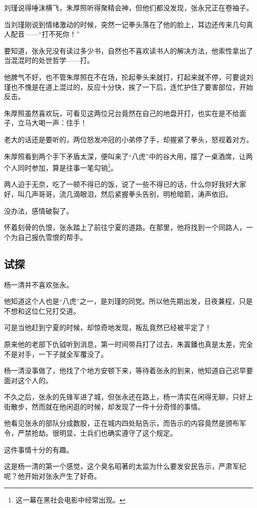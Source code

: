 \begin{multicols}{\theparacolNo}
刘瑾说得唾沫横飞，朱厚照听得聚精会神，但他们都没发现，张永兄正在卷袖子。

当刘瑾刚说到情绪激动的时候，突然一记拳头落在了他的脸上，耳边还传来几句真人配音——“打不死你！”

要知道，张永兄没有读过多少书，自然也不喜欢读书人的解决方法，他索性拿出了当混混时的处世哲学——打。

他脾气不好，也不管朱厚照在不在场，抡起拳头来就打，打起来就不停，可要说刘瑾也不愧是在道上混过的，反应十分快，挨了一下后，连忙护住了要害部位，开始反击。

朱厚照虽然喜欢玩，可看见这两位兄台竟然在自己的地盘开打，也实在是不给面子，立马大喝一声：住手！

老大的话还是要听的，两位怒发冲冠的小弟停了手，却握紧了拳头，怒视着对方。

朱厚照看到两个手下矛盾太深，便叫来了“八虎”中的谷大用，摆了一桌酒席，让两个人同时参加，算是往事一笔勾销\footnote{这一幕在黑社会电影中经常出现。}。

两人迫于无奈，吃了一顿不得已的饭，说了一些不得已的话，什么你好我好大家好，叫几声哥哥，流几滴眼泪，然后紧握拳头告别，明枪暗箭，涛声依旧。

没办法，感情破裂了。

怀着刻骨的仇恨，张永踏上了前往宁夏的道路。在那里，他将找到一个同路人，一个为自己报仇雪恨的帮手。

\subsection{试探}
杨一清并不喜欢张永。

他知道这个人也是“八虎”之一，是刘瑾的同党。所以他先期出发，日夜兼程，只是不想和这位仁兄打交道。

可是当他赶到宁夏的时候，却惊奇地发现，叛乱竟然已经被平定了！

原来他的老部下仇钺听到消息，第一时间带兵打了过去，朱寘鐇也真是太差，完全不是对手，一下子就全军覆没了。

杨一清没事做了，他找了个地方安顿下来，等待着张永的到来，他知道自己迟早要面对这个人的。

不久之后，张永的先锋军进了城，但张永还在路上，杨一清实在闲得无聊，只好上街散步，然而就在他闲逛的时候，却发现了一件十分奇怪的事情。

他看见张永的部队分成数股，正在城内四处贴告示，而告示的内容竟然是颁布军令，严禁抢劫。很明显，士兵们也确实遵守了这个规定。

这件事情十分的有趣。

这是杨一清的第一个感觉，这个臭名昭著的太监为什么要发安民告示，严肃军纪呢？他开始对张永产生了好奇。


\end{multicols}
